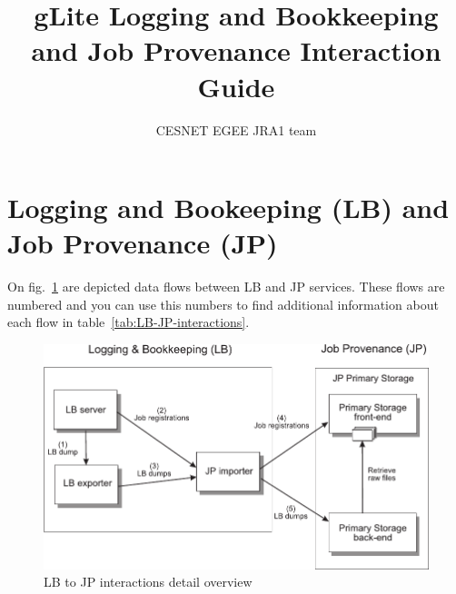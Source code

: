 \documentclass{egee}
\title{gLite Logging and Bookkeeping and Job Provenance Interaction Guide}
\author{CESNET EGEE JRA1 team}
\begin{document}
%

\section{Logging and Bookeeping (LB) and Job Provenance (JP)}
On fig.~\ref{fig:LB-JP-interactions} are depicted data flows between
LB and JP services. These flows are numbered and you can use this
numbers to find additional information about each flow in
table~\ref{tab:LB-JP-interactions}.

\begin{figure}[htpb]
  \centering
  \includegraphics[width=0.9\hsize]{LB-JP-interaction-details}
  \caption{LB to JP interactions detail overview}
  \label{fig:LB-JP-interactions}
\end{figure}
\end{document}

